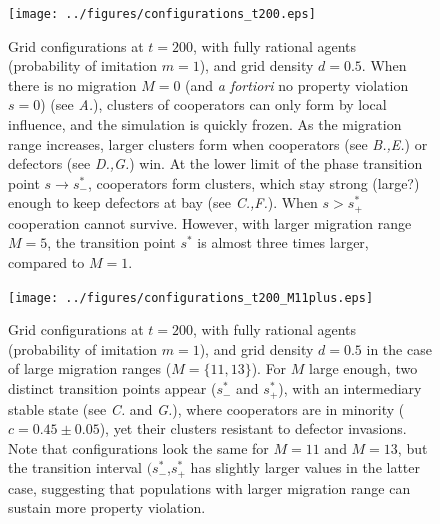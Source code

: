\begin{figure}[h]
\begin{center}
\centerline{\texttt{[image: ../figures/configurations\_t200.eps]}}
\caption{Grid configurations at $t=200$, with fully rational agents (probability of imitation $m=1$), and grid density $d=0.5$. When there is no migration $M=0$ (and {\it a fortiori} no property violation $s=0$) (see {\it A.}), clusters of cooperators can only form by local influence, and the simulation is quickly frozen. As the migration range increases, larger clusters form when cooperators (see {\it B.,E.}) or defectors (see {\it D.,G.}) win. At the lower limit of the phase transition point $s \rightarrow s^{*}_{-}$, cooperators form clusters, which stay strong (large?) enough to keep defectors at bay (see {\it C.,F.}). When $s > s^{*}_{+}$ cooperation cannot survive. However, with larger migration range $M=5$, the transition point $s^*$ is almost three times larger, compared to $M=1$.}
\label{fig:configurations_t200}
\end{center}
\end{figure}


\begin{figure}[h]
\begin{center}
\centerline{\texttt{[image: ../figures/configurations\_t200\_M11plus.eps]}}
\caption{Grid configurations at $t=200$, with fully rational agents (probability of imitation $m=1$), and grid density $d=0.5$ in the case of large migration ranges ($M = \{11,13\}$). For $M$ large enough, two distinct transition points appear ($s^{*}_{-}$ and $s^{*}_{+}$), with an intermediary stable state (see {\it C.} and {\it G.}), where cooperators are in minority ($c = 0.45\pm0.05$), yet their clusters resistant to defector invasions. Note that configurations look the same for $M=11$ and $M=13$, but the transition interval $(s^{*}_{-}$,$s^{*}_{+}$ has slightly larger values in the latter case, suggesting that populations with larger migration range can sustain more property violation.}
\label{fig:configurations_t200_M11plus}
\end{center}
\end{figure}






